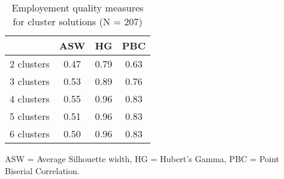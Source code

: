 \begin{table}[htp]
\footnotesize
\setlength{\tabcolsep}{35pt}
\renewcommand{\arraystretch}{1.3}
\begin{threeparttable}
\centering
\caption{Employement quality measures for cluster solutions (N = 207)} 
\label{tab:quality_clusters_job}
\begin{tabular}{lccc}
  \hline
 & ASW & HG & PBC \\ 
  \hline
2 clusters & 0.47 & 0.79 & 0.63 \\ 
  3 clusters & 0.53 & 0.89 & 0.76 \\ 
  4 clusters & 0.55 & 0.96 & 0.83 \\ 
  5 clusters & 0.51 & 0.96 & 0.83 \\ 
  6 clusters & 0.50 & 0.96 & 0.83 \\ 
   \hline
\end{tabular}
\begin{tablenotes}
\scriptsize
\item ASW = Average Silhouette width, HG = Hubert's Gamma, PBC = Point Biserial Correlation.
\end{tablenotes}
\end{threeparttable}
\end{table}
